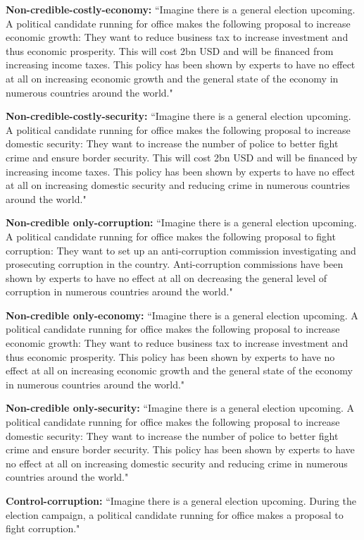 \documentclass[11pt]{article}
\begin{document}
\textbf{Non-credible-costly-economy:}
“Imagine there is a general election upcoming. A political candidate running for office makes the following proposal to increase economic growth: They want to reduce business tax to increase investment and thus economic prosperity. This will cost 2bn USD and will be financed from increasing income taxes. This policy has been shown by experts to have no effect at all on increasing economic growth and the general state of the economy in numerous countries around the world."

\textbf{Non-credible-costly-security:}
“Imagine there is a general election upcoming. A political candidate running for office makes the following proposal to increase domestic security: They want to increase the number of police to better fight crime and ensure border security. This will cost 2bn USD and will be financed by increasing income taxes. This policy has  been shown by experts to have no effect at all on increasing domestic security and reducing crime in numerous countries around the world."

\textbf{Non-credible only-corruption:}
“Imagine there is a general election upcoming. A political candidate running for office makes the following proposal to fight corruption: They want to set up an anti-corruption commission investigating and prosecuting corruption in the country. Anti-corruption commissions have been shown by experts to have no effect at all on decreasing the general level of corruption in numerous countries around the world."

\textbf{Non-credible only-economy:}
“Imagine there is a general election upcoming. A political candidate running for office makes the following proposal to increase economic growth: They want to reduce business tax to increase investment and thus economic prosperity. This policy has been shown by experts to have no effect at all on increasing economic growth and the general state of the economy in numerous countries around the world."

\textbf{Non-credible only-security:}
“Imagine there is a general election upcoming. A political candidate running for office makes the following proposal to increase domestic security: They want to increase the number of police to better fight crime and ensure border security. This policy has been shown by experts to have no effect at all on increasing domestic security and reducing crime in numerous countries around the world."

\textbf{Control-corruption:}
“Imagine there is a general election upcoming. During the election campaign, a political candidate running for office makes a proposal to fight corruption."
\end{document}

